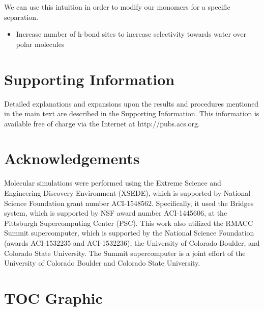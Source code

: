 \documentclass{article}
\begin{document}
  We can use this intuition in order to modify our monomers for a specific 
  separation.
  \begin{itemize}
	\item Increase number of h-bond sites to increase selectivity towards water 
	over polar molecules
  \end{itemize}
  
 
  \section*{Supporting Information}

  Detailed explanations and expansions upon the results and procedures mentioned in
  the main text are described in the Supporting Information. This information is
  available free of charge via the Internet at http://pubs.acs.org.

  \section*{Acknowledgements}

  Molecular simulations were performed using the Extreme Science and
  Engineering Discovery Environment (XSEDE), which is supported by National
  Science Foundation grant number ACI-1548562. Specifically, it used the Bridges
  system, which is supported by NSF award number ACI-1445606, at the Pittsburgh
  Supercomputing Center (PSC). This work also utilized the RMACC Summit supercomputer,
  which is supported by the National Science Foundation (awards ACI-1532235 and
  ACI-1532236), the University of Colorado Boulder, and Colorado State
  University. The Summit supercomputer is a joint effort of the University of
  Colorado Boulder and Colorado State University.

  \clearpage

  
  

  \newpage

  \section*{TOC Graphic}
\end{document}
